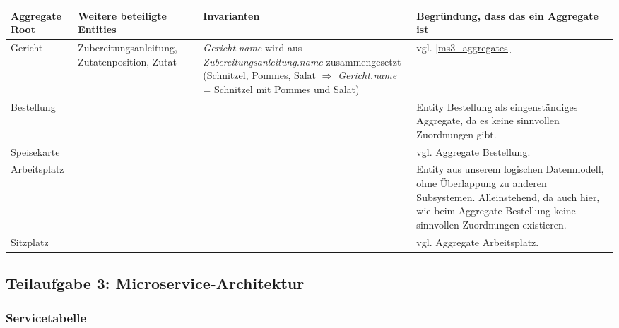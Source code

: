 \begin{center}
\begin{tabu} to 
\hline{}
Aggregate Root &Weitere beteiligte Entities &Invarianten
  &Begr\"undung, dass das ein Aggregate ist \\
\hline
Gericht &Zubereitungsanleitung, Zutatenposition, Zutat
  &\textit{Gericht.name} wird aus
  \textit{Zubereitungsanleitung.name}
  zusammengesetzt (Schnitzel, Pommes, Salat $\Rightarrow$
  \textit{Gericht.name} = Schnitzel mit Pommes und Salat)
  &vgl. \ref{ms3_aggregates} \\
\hline
Bestellung & & &Entity Bestellung als eingenst\"andiges
  Aggregate, da es keine sinnvollen Zuordnungen gibt.\\
\hline
Speisekarte & & &vgl. Aggregate Bestellung. \\
\hline
Arbeitsplatz & & &Entity aus unserem logischen Datenmodell,
  ohne \"Uberlappung zu anderen Subsystemen. Alleinstehend,
  da auch hier, wie beim Aggregate Bestellung keine
  sinnvollen Zuordnungen existieren. \\
\hline
Sitzplatz & & &vgl. Aggregate Arbeitsplatz. \\
\hline
\end{tabu}
\end{center}

\subsection{Teilaufgabe 3: Microservice-Architektur}

\subsubsection{Servicetabelle}

